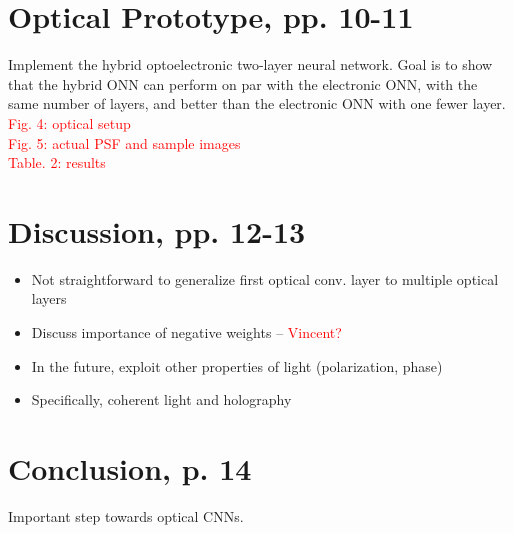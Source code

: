 \documentclass[runningheads]{llncs}
\newcommand{\red}[1]{\textcolor{red}{#1}}
\begin{document}
\section{Optical Prototype, pp. 10-11}
\label{sec:prototype}
Implement the hybrid optoelectronic two-layer neural network. Goal is to show that the hybrid ONN can perform on par with the electronic ONN, with the same number of layers, and better than the electronic ONN with one fewer layer.\\
\red{Fig. 4: optical setup} \\
\red{Fig. 5: actual PSF and sample images} \\
\red{Table. 2: results}

\section{Discussion, pp. 12-13}
\label{sec:discussion}
\begin{itemize}
\item Not straightforward to generalize first optical conv. layer to multiple optical layers
\item Discuss importance of negative weights – \red{Vincent?}
\item In the future, exploit other properties of light (polarization, phase)	
\item Specifically, coherent light and holography
\end{itemize}

\section{Conclusion, p. 14}
\label{sec:conclusion}
% 
Important step towards optical CNNs.

\clearpage



\end{document}
